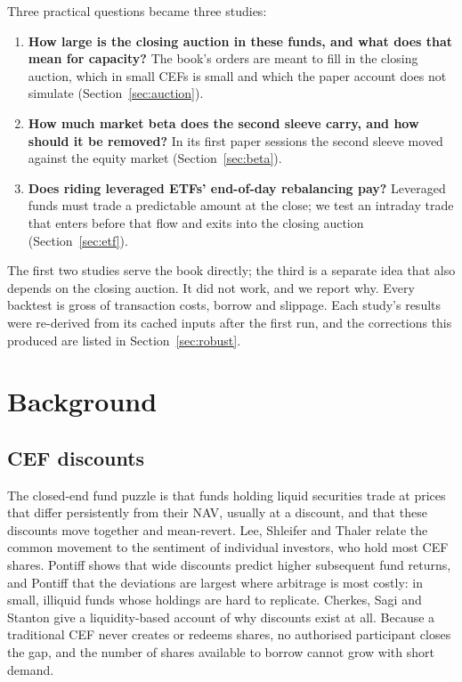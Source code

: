 \documentclass[10pt, a4paper, twocolumn]{article}
\begin{document}
Three practical questions became three studies:
\begin{enumerate}[nosep,leftmargin=*]
    \item \textbf{How large is the closing auction in these funds, and what does that mean for capacity?} The book's orders are meant to fill in the closing auction, which in small CEFs is small and which the paper account does not simulate (Section~\ref{sec:auction}).
    \item \textbf{How much market beta does the second sleeve carry, and how should it be removed?} In its first paper sessions the second sleeve moved against the equity market (Section~\ref{sec:beta}).
    \item \textbf{Does riding leveraged ETFs' end-of-day rebalancing pay?} Leveraged funds must trade a predictable amount at the close; we test an intraday trade that enters before that flow and exits into the closing auction (Section~\ref{sec:etf}).
\end{enumerate}

The first two studies serve the book directly; the third is a separate idea that also depends on the closing auction. It did not work, and we report why. Every backtest is gross of transaction costs, borrow and slippage. Each study's results were re-derived from its cached inputs after the first run, and the corrections this produced are listed in Section~\ref{sec:robust}.

\section{Background}
\label{sec:background}

\subsection{CEF discounts}

The closed-end fund puzzle is that funds holding liquid securities trade at prices that differ persistently from their NAV, usually at a discount, and that these discounts move together and mean-revert. Lee, Shleifer and Thaler \cite{lee1991} relate the common movement to the sentiment of individual investors, who hold most CEF shares. Pontiff \cite{pontiff1995} shows that wide discounts predict higher subsequent fund returns, and Pontiff \cite{pontiff1996} that the deviations are largest where arbitrage is most costly: in small, illiquid funds whose holdings are hard to replicate. Cherkes, Sagi and Stanton \cite{cherkes2009} give a liquidity-based account of why discounts exist at all. Because a traditional CEF never creates or redeems shares, no authorised participant closes the gap, and the number of shares available to borrow cannot grow with short demand.
\end{document}
